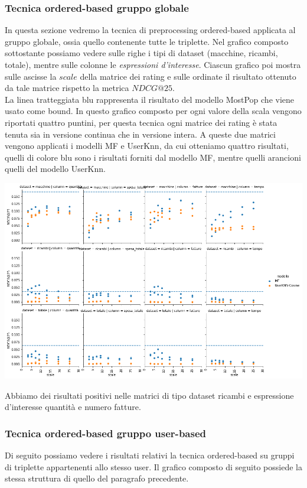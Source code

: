 \subsubsection{Tecnica ordered-based gruppo globale}
In questa sezione vedremo la tecnica di preprocessing ordered-based applicata al gruppo globale, ossia quello contenente tutte le triplette.
Nel grafico composto sottostante possiamo vedere sulle righe i tipi di dataset (macchine, ricambi, totale), mentre sulle colonne le \textit{espressioni d'interesse}. Ciascun grafico poi mostra sulle ascisse la $scale$ della matrice dei rating e sulle ordinate il risultato ottenuto da tale matrice rispetto la metrica $NDCG@25$. \\
La linea tratteggiata blu rappresenta il risultato del modello MostPop che viene usato come bound.
In questo grafico composto per ogni valore della scala vengono riportati quattro puntini, per questa tecnica ogni matrice dei rating è stata tenuta sia in versione continua che in versione intera. A queste due matrici vengono applicati i modelli MF e UserKnn, da cui otteniamo quattro risultati, quelli di colore blu sono i risultati forniti dal modello MF, mentre quelli arancioni quelli del modello UserKnn.

\includegraphics[width=16cm]{figures/risultati_ordered_globale.png}

Abbiamo dei risultati positivi nelle matrici di tipo dataset ricambi e espressione d'interesse quantità e numero fatture.\\

\subsubsection{Tecnica ordered-based gruppo user-based}
Di seguito possiamo vedere i risultati relativi la tecnica ordered-based su gruppi di triplette appartenenti allo stesso user.
Il grafico composto di seguito possiede la stessa struttura di quello del paragrafo precedente.\\

